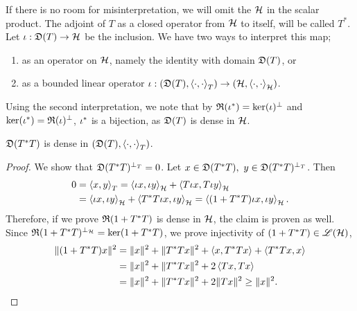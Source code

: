 If there is no room for misinterpretation,
we will omit the $\mathcal{H}$ in the scalar product. The adjoint of $T$ as a closed 
operator from $\mathcal{H}$ to itself, will be called $T^*$. 
Let $\iota : \mathfrak{D}(T) \to \mathcal{H}$ be the inclusion.
We have two ways to interpret this map;
\begin{enumerate}
 \item as an operator on $\mathcal{H}$, namely the identity with domain $\mathfrak{D}(T)$, or
 \item as a bounded linear operator $\iota : ( \mathfrak{D}(T) , \left\langle \cdot, \cdot \right\rangle_T)
 \to ( \mathcal{H} , \left\langle \cdot, \cdot \right\rangle_{\mathcal{H}})$.
\end{enumerate}
Using the second interpretation, we note that by $\mathfrak{R}(\iota^{*}) = \ker(\iota)^\perp$
and $\ker(\iota^{*}) = \mathfrak{R}(\iota)^\perp$, $\iota^{*}$ is a bijection,
as $\mathfrak{D}(T)$ is dense in $\mathcal{H}$. 
\begin{lem}\label{TTstrDense}
 $\mathfrak{D}(T^{*} T)$ is dense in $( \mathfrak{D}(T) , \left\langle \cdot, \cdot \right\rangle_T)$.
\end{lem}
\begin{proof}
 We show that $\mathfrak{D}(T ^{*} T)^{\perp_T} = 0$. Let $x \in \mathfrak{D}(T ^{*} T), 
 ~y \in \mathfrak{D}(T ^{*} T)^{\perp_T}$. Then
 \begin{align*}
  0 &=\left\langle x, y \right\rangle_T = \left\langle \iota x, \iota y \right\rangle_{\mathcal{H}} + \left\langle T\iota x, T\iota y \right\rangle
  _{\mathcal{H}} \\
  &=\left\langle \iota x, \iota y \right\rangle_{\mathcal{H}} + \left\langle T^{*} T\iota x, \iota y \right\rangle_{\mathcal{H}}
  = \left\langle (1 + T ^{*} T) \iota x, \iota y \right\rangle_{\mathcal{H}}.
 \end{align*}
Therefore, if we prove $\mathfrak{R}(1 + T^{*} T)$ is dense in $\mathcal{H}$, the claim is
proven as well. Since $\mathfrak{R}(1 + T^{*} T)^{\perp_{\mathcal{H}}} = \ker(1 + T^{*} T)$, we prove
injectivity of $(1 + T^{*} T) \in \mathscr{L}(\mathcal{H})$,
\begin{align*}
 \| (1 + T^{*} T)x \| ^2  
 &= \|x \| ^2 + \| T ^{*} T x\| ^2 + \left\langle x, T^{*} T x \right\rangle
 + \left\langle T ^{*} T x, x \right\rangle\\
 &=\|x \| ^2 + \| T ^{*} T x\| ^2 + 2\left\langle Tx,  T x \right\rangle \\
 &= \|x \| ^2 + \| T ^{*} T x\| ^2 + 2\|T x\|^2 \geq \|x\|^2.
\end{align*}

\end{proof}


